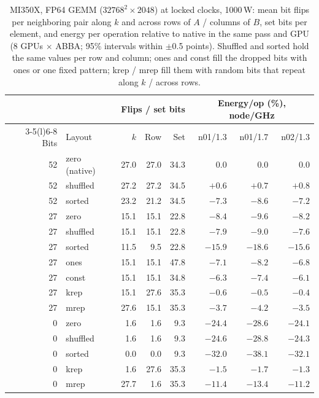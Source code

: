 \documentclass[conference]{IEEEtran}
\newcommand{\W}{\,W}
\newcommand{\pct}{\%}
\begin{document}
\begin{table}[t]
\caption{MI350X, FP64 GEMM ($32768^2\times2048$) at locked clocks, 1000\W: mean bit flips per neighboring pair along $k$
and across rows of $A$ / columns of $B$, set bits per element, and energy per operation relative to native in the same
pass and GPU (8 GPUs $\times$ ABBA; 95\pct{} intervals within $\pm$0.5 points). Shuffled and sorted hold the same values
per row and column; ones and const fill the dropped bits with ones or one fixed pattern; krep / mrep fill them with
random bits that repeat along $k$ / across rows.}\label{tab:mechall}
\centering\footnotesize\setlength{\tabcolsep}{2pt}
\begin{tabular}{@{}rlrrrrrr@{}}
\toprule
& & \multicolumn{3}{c}{Flips / set bits} & \multicolumn{3}{c}{Energy/op (\%), node/GHz} \\
\cmidrule(lr){3-5}\cmidrule(l){6-8}
Bits & Layout & $k$ & Row & Set & n01/1.3 & n01/1.7 & n02/1.3 \\
\midrule
52 & zero (native) & 27.0 & 27.0 & 34.3 & $0.0$ & $0.0$ & $0.0$ \\
52 & shuffled & 27.2 & 27.2 & 34.5 & $+0.6$ & $+0.7$ & $+0.8$ \\
52 & sorted & 23.2 & 21.2 & 34.5 & $-7.3$ & $-8.6$ & $-7.2$ \\
\midrule
27 & zero & 15.1 & 15.1 & 22.8 & $-8.4$ & $-9.6$ & $-8.2$ \\
27 & shuffled & 15.1 & 15.1 & 22.8 & $-7.9$ & $-9.0$ & $-7.6$ \\
27 & sorted & 11.5 & 9.5 & 22.8 & $-15.9$ & $-18.6$ & $-15.6$ \\
27 & ones & 15.1 & 15.1 & 47.8 & $-7.1$ & $-8.2$ & $-6.8$ \\
27 & const & 15.1 & 15.1 & 34.8 & $-6.3$ & $-7.4$ & $-6.1$ \\
27 & krep & 15.1 & 27.6 & 35.3 & $-0.6$ & $-0.5$ & $-0.4$ \\
27 & mrep & 27.6 & 15.1 & 35.3 & $-3.7$ & $-4.2$ & $-3.5$ \\
\midrule
0 & zero & 1.6 & 1.6 & 9.3 & $-24.4$ & $-28.6$ & $-24.1$ \\
0 & shuffled & 1.6 & 1.6 & 9.3 & $-24.6$ & $-28.8$ & $-24.3$ \\
0 & sorted & 0.0 & 0.0 & 9.3 & $-32.0$ & $-38.1$ & $-32.1$ \\
0 & krep & 1.6 & 27.6 & 35.3 & $-1.5$ & $-1.7$ & $-1.3$ \\
0 & mrep & 27.7 & 1.6 & 35.3 & $-11.4$ & $-13.4$ & $-11.2$ \\
\bottomrule
\end{tabular}
\end{table}
\end{document}
